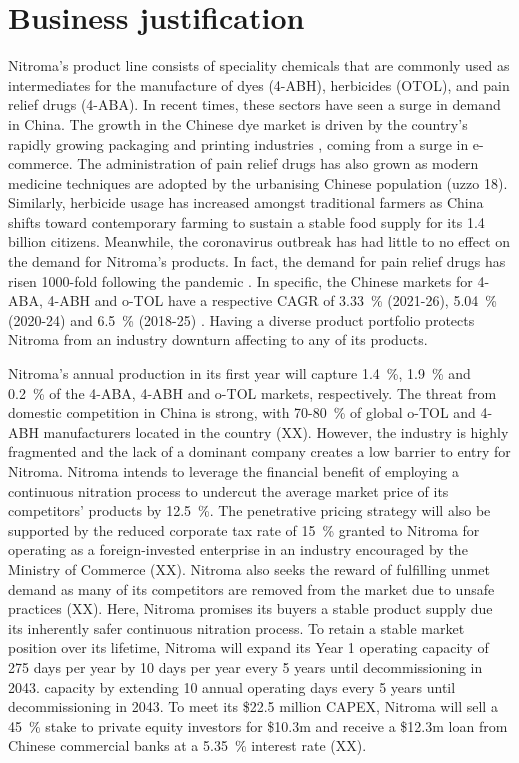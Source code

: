 \section*{Business justification}

Nitroma’s product line consists of speciality chemicals that are commonly used as intermediates for the manufacture of dyes (4-ABH), herbicides (OTOL), and pain relief drugs (4-ABA). In recent times, these sectors have seen a surge in demand in China. The growth in the Chinese dye market is driven by the country’s rapidly growing packaging and printing industries \cite{reportlinker_synthetic_2021}, coming from a surge in e-commerce. The administration of pain relief drugs has also grown as modern medicine techniques are adopted by the urbanising Chinese population (uzzo 18). Similarly, herbicide usage has increased amongst traditional farmers as China shifts toward contemporary farming to sustain a stable food supply for its 1.4 billion citizens. Meanwhile, the coronavirus outbreak has had little to no effect on the demand for Nitroma’s products. In fact, the demand for pain relief drugs has risen 1000-fold following the pandemic \cite{beroe_inc_coronavirus_2020}. In specific, the Chinese markets for 4-ABA, 4-ABH and o-TOL have a respective CAGR of \SI{3.33}{\percent} (2021-26), \SI{5.04}{\percent} (2020-24) and \SI{6.5}{\percent} (2018-25) \cite{wboc_global_2021,sumant_herbicides_2019,blad_game_nodate}. Having a diverse product portfolio protects Nitroma from an industry downturn affecting to any of its products.

Nitroma’s annual production in its first year will capture \SI{1.4}{\percent}, \SI{1.9}{\percent} and \SI{0.2}{\percent} of the 4-ABA, 4-ABH and o-TOL markets, respectively. The threat from domestic competition in China is strong, with 70-\SI{80}{\percent} of global o-TOL and 4-ABH manufacturers located in the country (XX). However, the industry is highly fragmented and the lack of a dominant company creates a low barrier to entry for Nitroma. Nitroma intends to leverage the financial benefit of employing a continuous nitration process to undercut the average market price of its competitors’ products by \SI{12.5}{\percent}.  The penetrative pricing strategy will also be supported by the reduced corporate tax rate of \SI{15}{\percent} granted to Nitroma for operating as a foreign-invested enterprise in an industry encouraged by the Ministry of Commerce (XX). Nitroma also seeks the reward of fulfilling unmet demand as many of its competitors are removed from the market due to unsafe practices (XX). Here, Nitroma promises its buyers a stable product supply due its inherently safer continuous nitration process. To retain a stable market position over its lifetime, Nitroma will expand its Year 1 operating capacity of 275 days per year by 10 days per year every 5 years until decommissioning in 2043.
capacity by extending 10 annual operating days every 5 years until decommissioning in 2043. 
To meet its \$22.5 million CAPEX, Nitroma will sell a \SI{45}{\percent} stake to private equity investors for \$10.3m and receive a \$12.3m loan from Chinese commercial banks at a \SI{5.35}{\percent} interest rate (XX).

